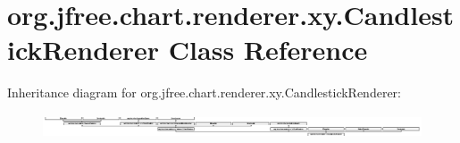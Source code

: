 \hypertarget{classorg_1_1jfree_1_1chart_1_1renderer_1_1xy_1_1_candlestick_renderer}{}\section{org.\+jfree.\+chart.\+renderer.\+xy.\+Candlestick\+Renderer Class Reference}
\label{classorg_1_1jfree_1_1chart_1_1renderer_1_1xy_1_1_candlestick_renderer}
Inheritance diagram for org.\+jfree.\+chart.\+renderer.\+xy.\+Candlestick\+Renderer\+:\begin{figure}[H]
\begin{center}
\leavevmode
\includegraphics[height=0.706625cm]{classorg_1_1jfree_1_1chart_1_1renderer_1_1xy_1_1_candlestick_renderer}
\end{center}
\end{figure}
